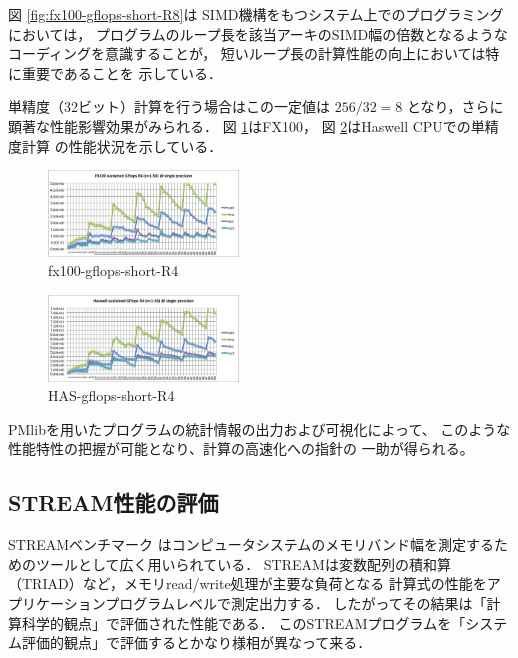 \documentclass[submit,techrep,noauthor]{ipsj}
\begin{document}
図 \ref{fig:fx100-gflops-short-R8}は
SIMD機構をもつシステム上でのプログラミングにおいては，
プログラムのループ長を該当アーキのSIMD幅の倍数となるような
コーディングを意識することが，
短いループ長の計算性能の向上においては特に重要であることを
示している．

単精度（32ビット）計算を行う場合はこの一定値は
\begin{math}
256 / 32 = 8
\end{math}
となり，さらに顕著な性能影響効果がみられる．
図 \ref{fig:fx100-gflops-short-R4}はFX100，
図 \ref{fig:HAS-gflops-short-R4}はHaswell CPUでの単精度計算
の性能状況を示している．

\begin{figure}[bt]
\centering\includegraphics[width=0.45\textwidth]{figs/fx100-gflops-short-R4}
\caption{fx100-gflops-short-R4}
\label{fig:fx100-gflops-short-R4}
\end{figure}


\begin{figure}[bt]
\centering\includegraphics[width=0.45\textwidth]{figs/HAS-gflops-short-R4}
\caption{HAS-gflops-short-R4}
\label{fig:HAS-gflops-short-R4}
\end{figure}

PMlibを用いたプログラムの統計情報の出力および可視化によって、
このような性能特性の把握が可能となり、計算の高速化への指針の
一助が得られる。



\subsection{STREAM性能の評価}
STREAMベンチマーク\cite{stream:1995}
はコンピュータシステムのメモリバンド幅を測定するためのツールとして広く用いられている．
STREAMは変数配列の積和算（TRIAD）など，メモリread/write処理が主要な負荷となる
計算式の性能をアプリケーションプログラムレベルで測定出力する．
したがってその結果は「計算科学的観点」で評価された性能である．
このSTREAMプログラムを「システム評価的観点」で評価するとかなり様相が異なって来る．
\end{document}
